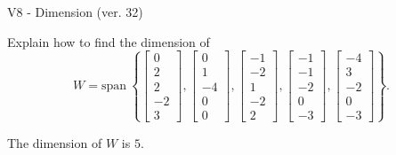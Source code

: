 \begin{exercise}
  \begin{exerciseTitle}V8 - Dimension (ver. 32)\end{exerciseTitle}
  \begin{exerciseStatement}
    Explain how to find the dimension of 
\[W=\mathrm{span}\ \left\{\left[\begin{array}{r}
0 \\
2 \\
2 \\
-2 \\
3
\end{array}\right] , \left[\begin{array}{r}
0 \\
1 \\
-4 \\
0 \\
0
\end{array}\right] , \left[\begin{array}{r}
-1 \\
-2 \\
1 \\
-2 \\
2
\end{array}\right] , \left[\begin{array}{r}
-1 \\
-1 \\
-2 \\
0 \\
-3
\end{array}\right] , \left[\begin{array}{r}
-4 \\
3 \\
-2 \\
0 \\
-3
\end{array}\right]\right\}.\]



  \end{exerciseStatement}
  \begin{exerciseAnswer}
   The dimension of \(W\) is  \(5\).
  


  \end{exerciseAnswer}
\end{exercise}